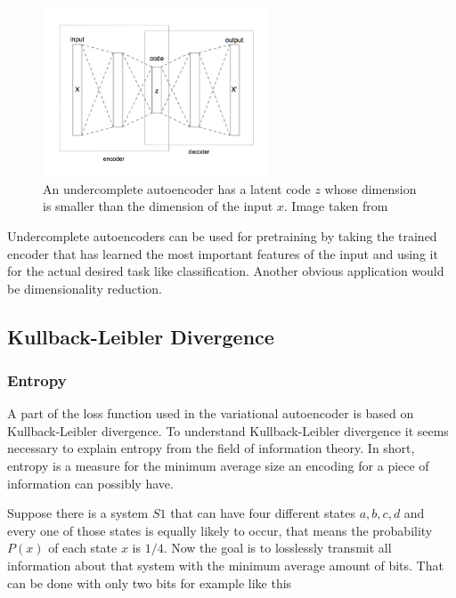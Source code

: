 \begin{figure}[h]
    \centering
    \includegraphics[width=0.6\textwidth]{images/figures/Autoencoder_structure.png}
    \caption{An undercomplete autoencoder has a latent code $z$ whose dimension is smaller than the 
    dimension of the input $x$.
    Image taken from \parencite{2015-Chervinskii-autoencoder}} \label{figure_undercomplete_ae}
\end{figure}

Undercomplete autoencoders can be used for pretraining by taking the trained encoder that has 
learned the most important features of the input and using it for the actual desired task like 
classification. Another obvious application would be dimensionality reduction.

\subsection{Kullback-Leibler Divergence} \label{KL-Divergence}

\subsubsection{Entropy}

A part of the loss function used in the variational autoencoder is based on Kullback-Leibler divergence.
To understand Kullback-Leibler divergence it seems necessary to explain entropy from
the field of information theory. In short, entropy is a measure for the minimum average size an
encoding for a piece of information can possibly have.

Suppose there is a system $S1$ that can have four different states $a, b, c, d$
and every one of those states is equally likely to occur, that means the probability $P(x)$
of each state $x$ is $1/4$. Now the goal is to losslessly transmit all information about that system
with the minimum average amount of bits. That can be done with only two bits for example like this

